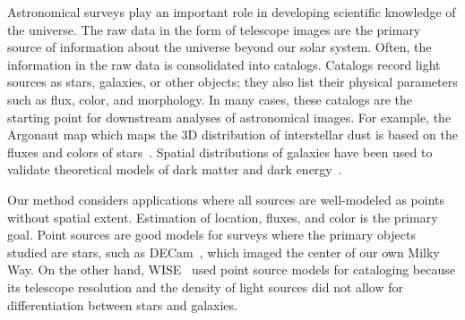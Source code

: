 Astronomical surveys play an important role in developing scientific knowledge of the universe. 
The raw data in the form of telescope images are the primary source of information about the universe beyond our solar system. 
Often, the information in the raw data is consolidated into catalogs. 
Catalogs record light sources as stars, galaxies, or other objects; 
they also list their physical parameters such as flux, color, and morphology. 
In many cases, these catalogs are the starting point for downstream analyses of astronomical images.
For example, the Argonaut map which maps the 3D distribution of interstellar dust is based on the fluxes and colors of stars~\cite{Green_2019_argonaut}. 
Spatial distributions of galaxies have been used to validate theoretical models of dark matter and dark energy~\cite{Eisenstein_2005_darkmatter}. 


Our method considers applications where all sources are well-modeled as points without spatial extent. Estimation of location, fluxes, and color is the primary goal.
Point sources are good models for surveys where the primary objects studied are stars, such as DECam~\cite{Schlafly_2018_DECam}, which imaged the center of our own Milky Way. 
On the other hand, WISE~\cite{Wright_2010_WISESurvey} used point source models for cataloging because its telescope resolution and the density of light sources did not allow for differentiation between stars and galaxies. 

